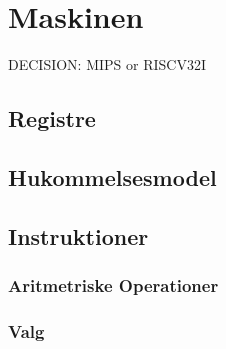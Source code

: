 \chapter{Maskinen}
\label{sec:machine}

DECISION: MIPS or RISCV32I

\section{Registre}

\section{Hukommelsesmodel}

\section{Instruktioner}

\subsection{Aritmetriske Operationer}

\subsection{Valg}


